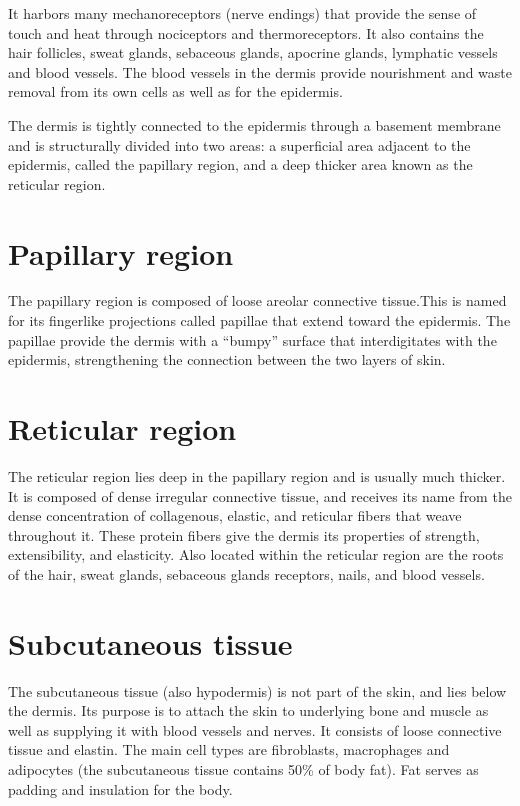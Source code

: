 It harbors many mechanoreceptors (nerve endings) that provide the sense
of touch and heat through nociceptors and thermoreceptors. It also
contains the hair follicles, sweat glands, sebaceous glands, apocrine
glands, lymphatic vessels and blood vessels. The blood vessels in the
dermis provide nourishment and waste removal from its own cells as well
as for the epidermis.

The dermis is tightly connected to the epidermis through a basement
membrane and is structurally divided into two areas: a superficial area
adjacent to the epidermis, called the papillary region, and a deep
thicker area known as the reticular region.

\section{Papillary region}\label{papillary-region}

The papillary region is composed of loose areolar connective tissue.This
is named for its fingerlike projections called papillae that extend
toward the epidermis. The papillae provide the dermis with a ``bumpy''
surface that interdigitates with the epidermis, strengthening the
connection between the two layers of skin.

\section{Reticular region}\label{reticular-region}

The reticular region lies deep in the papillary region and is usually
much thicker. It is composed of dense irregular connective tissue, and
receives its name from the dense concentration of collagenous, elastic,
and reticular fibers that weave throughout it. These protein fibers give
the dermis its properties of strength, extensibility, and elasticity.
Also located within the reticular region are the roots of the hair,
sweat glands, sebaceous glands receptors, nails, and blood vessels.

\section{Subcutaneous tissue}\label{subcutaneous-tissue}

The subcutaneous tissue (also hypodermis) is not part of the skin, and
lies below the dermis. Its purpose is to attach the skin to underlying
bone and muscle as well as supplying it with blood vessels and nerves.
It consists of loose connective tissue and elastin. The main cell types
are fibroblasts, macrophages and adipocytes (the subcutaneous tissue
contains 50\% of body fat). Fat serves as padding and insulation for the
body.

